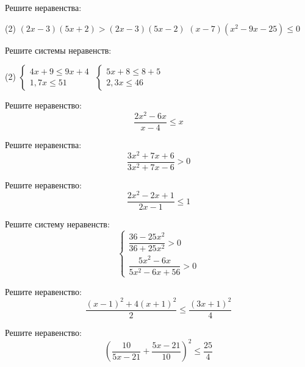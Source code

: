 \begin{class}[number=4]
	\begin{listofex}
		\item Решите неравенства:
		\begin{tasks}(2)
			\task \( (2x-3)(5x+2)>(2x-3)(5x -2) \)
			\task \( (x-7)(x^2-9x-25) \le 0 \)
		\end{tasks}
		\item Решите системы неравенств:
		\begin{tasks}(2)
			\task \( \begin{cases} 4x+9 \le 9x+4 \\ 1,7x \le 51 \end{cases} \)
			\task \( \begin{cases} 5x+8 \le 8+5 \\ 2,3x \le 46 \end{cases} \)
		\end{tasks}
		\item Решите неравенство: %
		\[ \dfrac{2x^2-6x}{x-4} \le x \]
		\item Решите неравенства: %
		\[ \dfrac{3x^2+7x+6}{3x^2+7x-6} > 0 \]
		\item Решите неравенство: %
		\[ \dfrac{2x^2-2x+1}{2x-1} \le 1 \]
		\item Решите систему неравенств: %
		\[ \begin{cases} \dfrac{36-25x^2}{36+25x^2} > 0 \\[10pt] \dfrac{5x^2-6x}{5x^2-6x+56} > 0 \end{cases} \]
		\item Решите неравенство: %
		\[ \dfrac{(x-1)^2+4(x+1)^2}{2} \le \dfrac{(3x+1)^2}{4} \]
		\item Решите неравенство: %
		\[ \left( \dfrac{10}{5x-21}+\dfrac{5x-21}{10} \right)^2 \le \dfrac{25}{4} \]
		
	\end{listofex}
\end{class}

